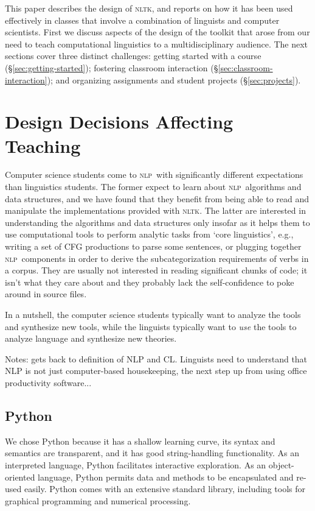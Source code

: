 \documentclass[11pt]{article}
\newcommand{\NLP}{\textsc{nlp}}
\newcommand{\NLTK}{\textsc{nltk}}
\begin{document}
This paper describes the design of \NLTK, and reports on how it has
been used effectively in classes that involve a combination of
linguists and computer scientists.  First we discuss aspects of the
design of the toolkit that arose from our need to teach computational
linguistics to a multidisciplinary audience.  The next sections
cover three distinct challenges:
getting started with a course (\S\ref{sec:getting-started});
fostering classroom interaction (\S\ref{sec:classroom-interaction});
and organizing assignments and student projects (\S\ref{sec:projects}).

\section{Design Decisions Affecting Teaching}
\label{sec:design}

Computer science students come to \NLP\ with significantly different
expectations than linguistics students.  The former expect to learn
about \NLP\ algorithms and data structures, and we have found that
they benefit from being able to read and manipulate the
implementations provided with \NLTK.  The latter are interested in
understanding the algorithms and data structures only insofar as it helps them
to use computational tools to perform analytic tasks from `core linguistics',
e.g., writing a set of CFG productions to parse some sentences, or
plugging together \NLP\ components in order to derive the subcategorization
requirements of verbs in a corpus.
They are usually not interested in reading significant chunks of code;
it isn't what they care about and they
probably lack the self-confidence to poke around in source files.

In a nutshell, the computer science students typically want to analyze the
tools and synthesize new tools, while the linguists typically want to \emph{use}
the tools to analyze language and synthesize new theories.

Notes: gets back to definition of NLP and CL.  Linguists need to understand
that NLP is not just computer-based housekeeping, the next step up from using
office productivity software...

\subsection{Python}

We chose Python because it has a shallow learning curve, its syntax
and semantics are transparent, and it has good string-handling
functionality.  As an interpreted language, Python facilitates
interactive exploration.  As an object-oriented language, Python
permits data and methods to be encapsulated and re-used easily.  Python comes with an extensive
standard library, including tools for graphical programming and
numerical processing.
\end{document}
